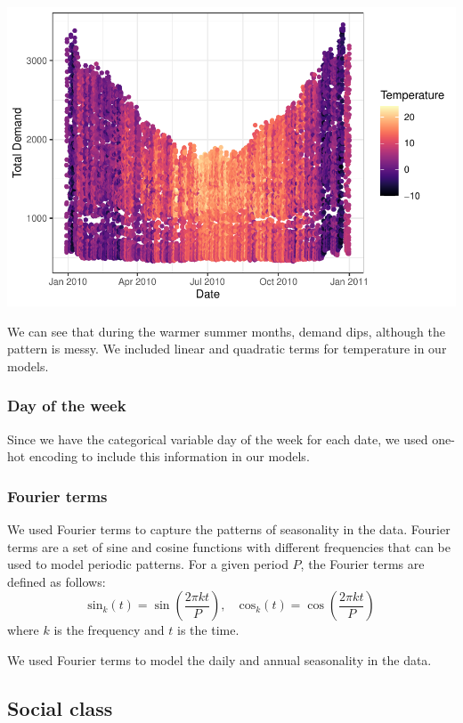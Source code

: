 \documentclass[
]{article}
\begin{document}
\includegraphics{main_files/figure-latex/unnamed-chunk-3-1.pdf}

We can see that during the warmer summer months, demand dips, although
the pattern is messy. We included linear and quadratic terms for
temperature in our models.

\hypertarget{day-of-the-week}{%
\subsubsection{Day of the week}\label{day-of-the-week}}

Since we have the categorical variable day of the week for each date, we
used one-hot encoding to include this information in our models.

\hypertarget{fourier-terms}{%
\subsubsection{Fourier terms}\label{fourier-terms}}

We used Fourier terms to capture the patterns of seasonality in the
data. Fourier terms are a set of sine and cosine functions with
different frequencies that can be used to model periodic patterns. For a
given period \(P\), the Fourier terms are defined as follows:
\[\text{sin}_k(t) = \sin\left(\frac{2\pi kt}{P}\right), \quad \text{cos}_k(t) = \cos\left(\frac{2\pi kt}{P}\right)\]
where \(k\) is the frequency and \(t\) is the time.

We used Fourier terms to model the daily and annual seasonality in the
data.

\hypertarget{social-class}{%
\subsection{Social class}\label{social-class}}
\end{document}

